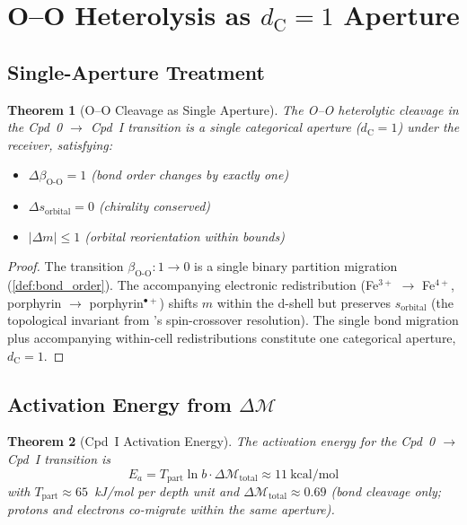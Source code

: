 \documentclass[11pt,twocolumn,a4paper]{article}
\newtheorem{theorem}{Theorem}[section]
\theoremstyle{definition}
\theoremstyle{remark}
\newcommand{\depth}{\mathcal{M}}
\newcommand{\dC}{d_{\mathrm{C}}}
\newcommand{\bondorder}{\beta_{\mathrm{O\text{-}O}}}
\begin{document}
\section{O--O Heterolysis as $\dC = 1$ Aperture}
\label{sec:oo_heterolysis}

\subsection{Single-Aperture Treatment}

\begin{theorem}[O--O Cleavage as Single Aperture]
\label{thm:oo_single}
The O--O heterolytic cleavage in the Cpd~0 $\to$ Cpd~I transition is a
single categorical aperture ($\dC = 1$) under the receiver, satisfying:
\begin{itemize}[nosep]
\item $\Delta\bondorder = 1$ (bond order changes by exactly one)
\item $\Delta s_{\mathrm{orbital}} = 0$ (chirality conserved)
\item $|\Delta m| \leq 1$ (orbital reorientation within bounds)
\end{itemize}
\end{theorem}

\begin{proof}
The transition $\bondorder: 1 \to 0$ is a single binary partition migration
(\cref{def:bond_order}). The accompanying electronic redistribution
(Fe$^{3+}$ $\to$ Fe$^{4+}$, porphyrin $\to$ porphyrin$^{\bullet+}$) shifts
$m$ within the d-shell but preserves $s_{\mathrm{orbital}}$ (the
topological invariant from \citep{sachikonye2025_paper1}'s spin-crossover
resolution). The single bond migration plus accompanying within-cell
redistributions constitute one categorical aperture, $\dC = 1$.
\end{proof}

\subsection{Activation Energy from $\Delta\depth$}

\begin{theorem}[Cpd~I Activation Energy]
\label{thm:cpdI_Ea}
The activation energy for the Cpd~0 $\to$ Cpd~I transition is
\begin{equation}
E_a = T_{\mathrm{part}} \ln b \cdot \Delta\depth_{\mathrm{total}} \approx 11~\mathrm{kcal/mol}
\label{eq:cpdI_Ea}
\end{equation}
with $T_{\mathrm{part}} \approx 65$~kJ/mol per depth unit and
$\Delta\depth_{\mathrm{total}} \approx 0.69$ (bond cleavage only; protons and
electrons co-migrate within the same aperture).
\end{theorem}
\end{document}

